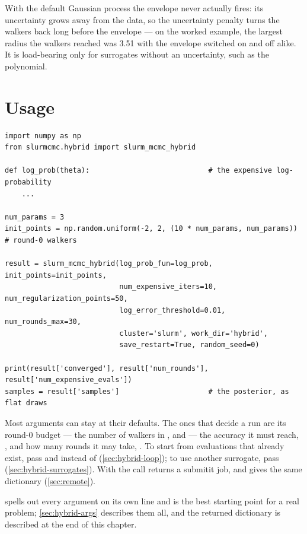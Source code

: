 With the default Gaussian process the envelope never actually fires: its uncertainty grows away from
the data, so the uncertainty penalty turns the walkers back long before the envelope --- on the
worked example, the largest radius the walkers reached was 3.51 with the envelope switched on and off
alike. It is load-bearing only for surrogates without an uncertainty, such as the polynomial.

\section{Usage}
\label{sec:hybrid-usage}

\begin{lstlisting}
import numpy as np
from slurmcmc.hybrid import slurm_mcmc_hybrid

def log_prob(theta):                            # the expensive log-probability
    ...

num_params = 3
init_points = np.random.uniform(-2, 2, (10 * num_params, num_params))   # round-0 walkers

result = slurm_mcmc_hybrid(log_prob_fun=log_prob, init_points=init_points,
                           num_expensive_iters=10, num_regularization_points=50,
                           log_error_threshold=0.01, num_rounds_max=30,
                           cluster='slurm', work_dir='hybrid',
                           save_restart=True, random_seed=0)

print(result['converged'], result['num_rounds'], result['num_expensive_evals'])
samples = result['samples']                     # the posterior, as flat draws
\end{lstlisting}

Most arguments can stay at their defaults. The ones that decide a run are its round-0 budget ---
the number of walkers in ,  and
 --- the accuracy it must reach, , and
how many rounds it may take, . To start from evaluations that already exist,
pass  and  instead of 
(\cref{sec:hybrid-loop}); to use another surrogate, pass 
(\cref{sec:hybrid-surrogates}). With  the call returns a submitit job, and
 gives the same dictionary (\cref{sec:remote}).

 spells out every argument on its own line and is the best starting
point for a real problem; \cref{sec:hybrid-args} describes them all, and the returned dictionary is
described at the end of this chapter.

